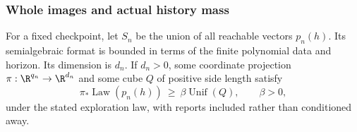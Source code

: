 \subsubsection{Whole images and actual history mass}
\begin{lemma}\label{lem:v18-image-mass}
For a fixed checkpoint, let $S_n$ be the union of all reachable vectors
$p_n(h)$. Its semialgebraic format is bounded in terms of the finite
polynomial data and horizon. Its dimension is $d_n$. If $d_n>0$, some
coordinate projection $\pi:\R^{q_n}\to\R^{d_n}$ and some cube $Q$
of positive side length satisfy
\begin{equation}\label{eq:v18-image-minorization}
 \pi_*\operatorname{Law}(p_n(h))\ \ge\ \beta\operatorname{Unif}(Q),
 \qquad \beta>0,
\end{equation}
under the stated exploration law, with reports included rather than
conditioned away.
\end{lemma}
